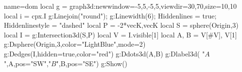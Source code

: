 \documentclass[12pt]{standalone}%
\begin{document}
\begin{luadraw}{name=dom}
local g = graph3d:new{window={-5,5,-5,5},viewdir={30,70},size={10,10}}
local i = cpx.I
g:Linejoin("round"); g:Linewidth(6); Hiddenlines = true; Hiddenlinestyle = "dashed"
local P = {-2*vecK,vecK}
local S = sphere(Origin,3)
local I = g:Intersection3d(S,P)
local V = I.visible[1]
local A, B = V[#V], V[1] 
g:Dsphere(Origin,3,{color="LightBlue",mode=2})
g:Dedges(I,{hidden=true,color="red"})
g:Ddots3d({A,B})
g:Dlabel3d( "$A$",A,{pos="SW"},"$B$",B,{pos="SE"})
g:Show()
\end{luadraw}
\end{document}
